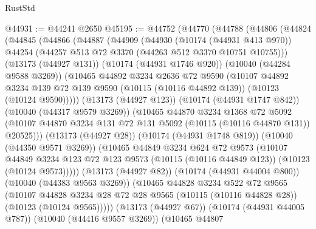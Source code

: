 \begin{lexlean}{RustStd}
\begin{coremodule}
@44931 := @44241 @2650
@45195 := @44752
    (@44770
      (@44788
        (@44806
          (@44824
            (@44845
              (@44866
                (@44887
                  (@44909
                    (@44930
                      (@10174 (@44931 @413 @970))
                      @44254
                      (@44257 @513 @72 @3370 (@44263 @512 @3370 @10751 @10755)))
                    (@13173 (@44927 @131))
                    (@10174 (@44931 @1746 @920))
                    (@10040 (@44284 @9588 @3269))
                    (@10465
                      @44892
                      @3234
                      @2636
                      @72
                      @9590
                      (@10107
                        @44892
                        @3234
                        @139
                        @72
                        @139
                        @9590
                        (@10115 (@10116 @44892 @139))
                        (@10123 (@10124 @9590)))))
                  (@13173 (@44927 @123))
                  (@10174 (@44931 @1747 @842))
                  (@10040 (@44317 @9579 @3269))
                  (@10465
                    @44870
                    @3234
                    @1368
                    @72
                    @5092
                    (@10107 @44870 @3234 @131 @72 @131 @5092 (@10115 (@10116 @44870 @131)) @20525)))
                (@13173 (@44927 @28))
                (@10174 (@44931 @1748 @819))
                (@10040 (@44350 @9571 @3269))
                (@10465
                  @44849
                  @3234
                  @624
                  @72
                  @9573
                  (@10107
                    @44849
                    @3234
                    @123
                    @72
                    @123
                    @9573
                    (@10115 (@10116 @44849 @123))
                    (@10123 (@10124 @9573)))))
              (@13173 (@44927 @82))
              (@10174 (@44931 @44004 @800))
              (@10040 (@44383 @9563 @3269))
              (@10465
                @44828
                @3234
                @522
                @72
                @9565
                (@10107
                  @44828
                  @3234
                  @28
                  @72
                  @28
                  @9565
                  (@10115 (@10116 @44828 @28))
                  (@10123 (@10124 @9565)))))
            (@13173 (@44927 @67))
            (@10174 (@44931 @44005 @787))
            (@10040 (@44416 @9557 @3269))
            (@10465
              @44807

\end{coremodule}
\end{lexlean}
